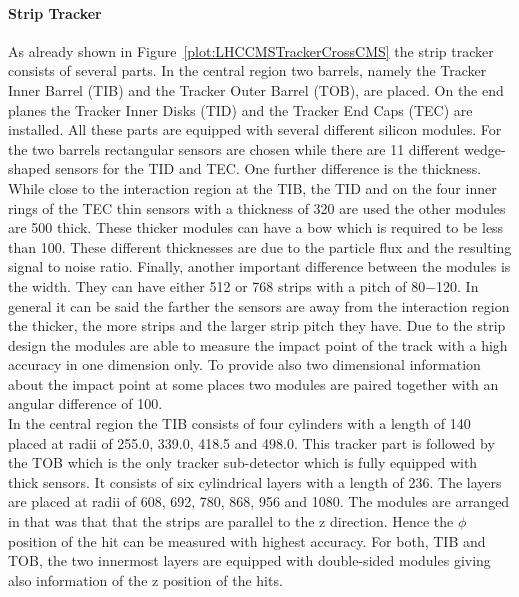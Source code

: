 \paragraph{Strip Tracker}
As already shown in Figure~\ref{plot:LHCCMSTrackerCrossCMS} the strip tracker consists of several parts. In the central region two barrels, namely the Tracker Inner Barrel (TIB) and the Tracker Outer Barrel (TOB), are placed. On the end planes the Tracker Inner Disks (TID) and the Tracker End Caps (TEC) are installed. All these parts are equipped with several different silicon modules. For the two barrels rectangular sensors are chosen while there are 11 different wedge-shaped sensors for the TID and TEC. One further difference is the thickness. While close to the interaction region at the TIB, the TID and on the four inner rings of the TEC thin sensors with a thickness of 320\mum{} are used the other modules are 500\mum{} thick. These thicker modules can have a bow which is required to be less than 100\mum{}. These different thicknesses are due to the particle flux and the resulting signal to noise ratio. Finally, another important difference between the modules is the width. They can have either 512 or 768 strips with a pitch of 80$-$120\mum{}. In general it can be said the farther the sensors are away from the interaction region the thicker, the more strips and the larger strip pitch they have. Due to the strip design the modules are able to measure the impact point of the track with a high accuracy in one dimension only. To provide also two dimensional information about the impact point at some places two modules are paired together with an angular difference of 100\mrad{}.\\
In the central region the TIB consists of four cylinders with a length of 140\cm{} placed at radii of 255.0, 339.0, 418.5 and 498.0\mm{}. This tracker part is followed by the TOB which is the only tracker sub-detector which is fully equipped with thick sensors. It consists of six cylindrical layers with a length of 236\cm{}. The layers are placed at radii of 608, 692, 780, 868, 956 and 1080\mm{}. The modules are arranged in that was that that the strips are parallel to the z direction. Hence the $\phi{}$ position of the hit can be measured with highest accuracy. For both, TIB and TOB, the two innermost layers are equipped with double-sided modules giving also information of the z position of the hits.\\
